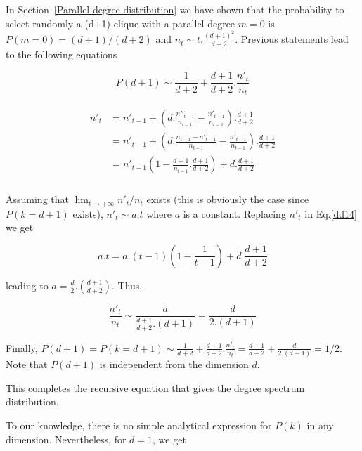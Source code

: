 \documentclass[11pt]{iopart}
\newenvironment{proof}[1][Proof]{\begin{trivlist}
    \item[\hskip \labelsep {\bfseries #1}]}{\end{trivlist}}
\newcommand{\qed}{\nobreak \ifvmode \relax \else
          \ifdim\lastskip<1.5em \hskip-\lastskip
          \hskip1.5em plus0em minus0.5em \fi \nobreak
          \vrule height0.75em width0.5em depth0.25em\fi}
\begin{document}
\begin{proof}
In Section~\ref{Parallel degree distribution} we have shown that the probability to select randomly a (d+1)-clique with a parallel degree $m=0$ is $P(m=0)=(d+1)/(d+2)$ and $n_t \sim t.\frac{(d+1)^2}{d+2}$. Previous statements lead to the following equations

\begin{equation}
\label{dd14}
 P(d+1) \sim \frac{1}{d+2} + \frac{d+1}{d+2}.\frac{n'_t}{n_t}
\end{equation}

\begin{eqnarray}
\label{Eq.dd15}
   \begin{array}{ll}
   n'_t &= n'_{t-1}+ \left(d.\frac{n''_{t-1}}{n_{t-1}} - \frac{n'_{t-1}}{n_{t-1}}\right).\frac{d+1}{d+2} \\
           &= n'_{t-1}+ \left(d.\frac{n_{t-1}- n'_{t-1}}{n_{t-1}} - \frac{n'_{t-1}}{n_{t-1}}\right).\frac{d+1}{d+2} \\
           &= n'_{t-1}\left(1 -\frac{d+1}{n_{t-1}}.\frac{d+1}{d+2}\right) + d.\frac{d+1}{d+2} \\
   \end{array}
\end{eqnarray}

Assuming that $\lim_{t \to +\infty} n'_t/n_t$ exists (this is obviously the case since $P(k=d+1)$ exists), $n'_t \sim a.t$ where $a$ is a constant. Replacing $n'_t$ in Eq.\ref{dd14} we get

\begin{equation}
\label{Eq.dd16}
 a.t = a.(t-1)\left(1-\frac{1}{t-1}\right)+ d.\frac{d+1}{d+2}
\end{equation}

leading to $a = \frac{d}{2}.(\frac{d+1}{d+2})$. Thus,

\begin{equation}
\label{Eq.dd17}
   \frac{n'_t}{n_t} \sim \frac{a}{\frac{d+1}{d+2}.(d+1)} = \frac{d}{2.(d+1)}
\end{equation}

Finally, $P(d+1) = P(k=d+1) \sim \frac{1}{d+2} + \frac{d+1}{d+2}.\frac{n'_t}{n_t} =  \frac{d+1}{d+2} + \frac{d}{2.(d+1)} = 1/2$. Note that $P(d+1)$ is independent from the dimension $d$. 

This completes the recursive equation that gives the degree spectrum distribution.
\qed
\end{proof}

To our knowledge, there is no simple analytical expression for $P(k)$ in any dimension. Nevertheless, for $d=1$, we get 
\end{document}
